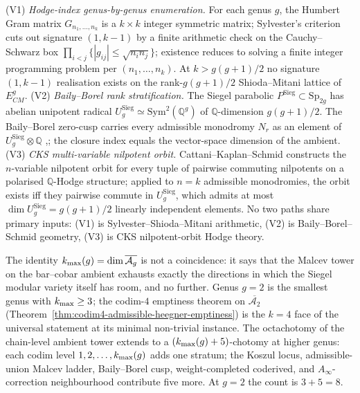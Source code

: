 \begin{remark}
\label{rem:three-verification-paths-universal-k-tower}
%
\textup{(V1)} \emph{Hodge-index genus-by-genus enumeration.} For
each genus $g$, the Humbert Gram matrix $G_{n_1,\ldots,n_k}$ is a
$k\times k$ integer symmetric matrix; Sylvester's criterion cuts
out signature $(1,k-1)$ by a finite arithmetic check on the
Cauchy--Schwarz box $\prod_{i<j}\{|g_{ij}|\le\sqrt{n_in_j}\}$;
existence reduces to solving a finite integer programming problem
per $(n_1,\ldots,n_k)$. At $k>g(g+1)/2$ no signature $(1,k-1)$
realisation exists on the rank-$g(g+1)/2$ Shioda--Mitani lattice
of $E^g_{CM}$.
\textup{(V2)} \emph{Baily--Borel rank stratification.} The Siegel
parabolic $P^{\mathrm{Sieg}}\subset\mathrm{Sp}_{2g}$ has abelian
unipotent radical
$U^{\mathrm{Sieg}}_g\simeq\mathrm{Sym}^2(\mathbb Q^g)$ of
$\mathbb Q$-dimension $g(g+1)/2$. The Baily--Borel zero-cusp
carries every admissible monodromy $N_r$ as an element of
$U^{\mathrm{Sieg}}_g\otimes\mathbb Q$
\cite[\S 5]{Schmid1973},\cite[Cor.~3.13]{CattaniKaplanSchmid1986};
the closure index equals the vector-space dimension of the
ambient.
\textup{(V3)} \emph{CKS multi-variable nilpotent orbit.}
Cattani--Kaplan--Schmid \cite[Thm.~3.3]{CattaniKaplanSchmid1986}
constructs the $n$-variable nilpotent orbit for every tuple of
pairwise commuting nilpotents on a polarised $\mathbb Q$-Hodge
structure; applied to $n=k$ admissible monodromies, the orbit
exists iff they pairwise commute in $U^{\mathrm{Sieg}}_g$, which
admits at most $\dim U^{\mathrm{Sieg}}_g=g(g+1)/2$ linearly
independent elements. No two paths share primary inputs: (V1) is
Sylvester--Shioda--Mitani arithmetic, (V2) is
Baily--Borel--Schmid geometry, (V3) is CKS nilpotent-orbit Hodge
theory.
\end{remark}

\begin{remark}
\label{rem:closure-index-universal-invariant}
%
The identity $k_{\max}(g)=\dim\overline{\mathcal A_g}$ is not a
coincidence: it says that the Malcev tower on the bar--cobar
ambient exhausts exactly the directions in which the Siegel
modular variety itself has room, and no further. Genus $g=2$ is
the smallest genus with $k_{\max}\ge 3$; the codim-$4$ emptiness
theorem on $\overline{\mathcal A_2}$
(Theorem~\textup{\ref{thm:codim4-admissible-heegner-emptiness}})
is the $k=4$ face of the universal statement at its minimal
non-trivial instance. The octachotomy of the chain-level ambient
tower extends to a $(k_{\max}(g)+5)$-chotomy at higher genus: each
codim level $1,2,\ldots,k_{\max}(g)$ adds one stratum; the Koszul
locus, admissible-union Malcev ladder, Baily--Borel cusp,
weight-completed coderived, and $A_\infty$-correction neighbourhood
contribute five more. At $g=2$ the count is $3+5=8$.
\end{remark}

